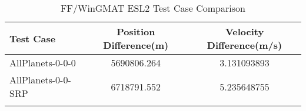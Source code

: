 \begin{table}[htbp!]
\centering
\caption{ FF/WinGMAT ESL2 Test Case Comparison}
      \begin{tabular}{lcc}
      \hline\hline
          Test Case & Position Difference(m) & Velocity Difference(m/s) \\
         \hline
         AllPlanets-0-0-0 & 5690806.264 & 3.131093893 \\
         AllPlanets-0-0-SRP & 6718791.552 & 5.235648755 \\
      \hline\hline
      \label{Table: ESL2 FF-WinGMAT Table} 
\end{tabular}
\end{table}

